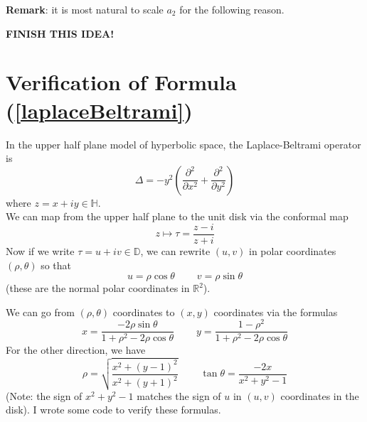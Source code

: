 \documentclass[]{article}
\begin{document}
\textbf{Remark}: it is most natural to scale $a_2$ for the following reason.

\textbf{FINISH THIS IDEA!}

\section*{Verification of Formula (\ref{laplaceBeltrami})}

In the upper half plane model of hyperbolic space, the Laplace-Beltrami operator is
$$
\Delta = -y^2\left( \frac{\partial^2}{\partial x^2} + \frac{\partial^2}{\partial y^2} \right)
$$
where $z = x + iy \in \mathbb{H}$.
\\

We can map from the upper half plane to the unit disk via the conformal map
$$
z \mapsto \tau = \frac{z-i}{z+i}
$$
Now if we write $\tau = u + iv \in \mathbb{D}$, we can rewrite $(u, v)$ in polar coordinates $(\rho, \theta)$ so that
$$
u = \rho\cos\theta ~~~~~~~~~~ v = \rho\sin\theta
$$
(these are the normal polar coordinates in $\mathbb{R}^2$).

We can go from $(\rho, \theta)$ coordinates to $(x, y)$ coordinates via the formulas
$$
x = \frac{-2\rho\sin\theta}{1 + \rho^2 - 2\rho\cos\theta} ~~~~~~~~~~
y = \frac{1 - \rho^2}{1 + \rho^2 - 2\rho\cos\theta}
$$
For the other direction, we have
$$
\rho = \sqrt{\frac{x^2 + (y-1)^2}{x^2 + (y+1)^2}} ~~~~~~~~~~
\tan\theta = \frac{-2x}{x^2 + y^2 - 1}
$$
(Note: the sign of $x^2 + y^2 - 1$ matches the sign of $u$ in $(u, v)$ coordinates in the disk).
I wrote some code to verify these formulas.
\\
\end{document}
